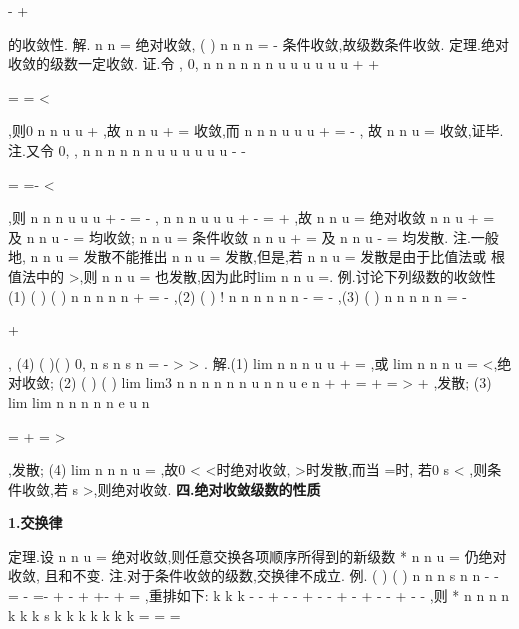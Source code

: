 -
+






\sum 
的收敛性. 
解.
n
n
\infty 
=\sum 
绝对收敛,
(
)
n
n
n
\infty 
=
-
\sum 
条件收敛,故级数条件收敛. 
\textcolor{lyred}{定理}.绝对收敛的级数一定收敛. 
\textcolor{lyred}{证}.令
,
0,
n
n
n
n
n
n
u
u
u
u
u
u
+
\ge 
+

=
=
<

,则0
n
n
u
u
+
\le 
\le 
,故
n
n
u
\infty 
+
=\sum 
收敛,而
n
n
n
u
u
u
+
=
-
, 
故
n
n
u
\infty 
=\sum 
收敛,证毕. 
\textcolor{lyred}{注}.又令
0,
,
n
n
n
n
n
n
u
u
u
u
u
u
-
\ge 
-

=
=-
<

,则
n
n
n
u
u
u
+
-
=
-
,
n
n
n
u
u
u
+
-
=
+
,故 
n
n
u
\infty 
=\sum 
绝对收敛
n
n
u
\infty 
+
=
\Leftrightarrow \sum 
及
n
n
u
\infty 
-
=\sum 
均收敛;
n
n
u
\infty 
=\sum 
条件收敛
n
n
u
\infty 
+
=
\Rightarrow \sum 
及
n
n
u
\infty 
-
=\sum 
均发散. 
\textcolor{lyred}{注}.一般地,
n
n
u
\infty 
=\sum 
发散不能推出
n
n
u
\infty 
=\sum 
发散,但是,若
n
n
u
\infty 
=\sum 
发散是由于比值法或 
根值法中的
\rho >,则
n
n
u
\infty 
=\sum 
也发散,因为此时lim
n
n
u
\to \infty 
=\infty . 
\textcolor{lyred}{例}.讨论下列级数的收敛性 
(1)
(
)
(
)
n n
n
n
n
\infty 
+
=
-
\sum 
,(2)
(
)
!
n
n
n
n
n
n
-
\infty 
=
-
\sum 
,(3)
(
)
n
n
n
n
n
\infty 
=
-


+




\sum 
, 
(4)
(
)(
)
0,
n
s
n
s
n
\alpha 
\alpha 
\infty 
=
-
>
>
\sum 
. 
解.(1)
lim
n
n
n
u
u
+
\to \infty 
=
,或
lim
n
n
n
u
\to \infty 
=
<,绝对收敛; 
(2)
(
)
(
)
lim
lim3
n
n
n
n
n
n
u
n
n
u
e
n
+
+
\to \infty 
\to \infty 
=
+
=
>
+
,发散; 
(3)
lim
lim
n
n
n
n
n
e
u
n
\to \infty 
\to \infty 


=
+
=
>




,发散; 
(4) lim n
n
n
u
\alpha 
\to \infty 
=
,故0
\alpha 
<
<时绝对收敛,
\alpha >时发散,而当
\alpha =时, 
若0
s
<
\le ,则条件收敛,若
s >,则绝对收敛. 
\vspace{4pt}
{\bfseries \textcolor{lyred}{四.绝对收敛级数的性质}}

{\bfseries \textcolor{lyred}{1.交换律}}

\textcolor{lyred}{定理}.设
n
n
u
\infty 
=\sum 
绝对收敛,则任意交换各项顺序所得到的新级数
*
n
n
u
\infty 
=\sum 
仍绝对收敛, 
且和不变. 
\textcolor{lyred}{注}.对于条件收敛的级数,交换律不成立. 
\textcolor{lyred}{例}.
(
)
(
)
n
n
n
s
n
n
\infty 
-
-
=
-
=-
+
-
+
+-
+
=
\sum 
\Lambda 
\Lambda 
,重排如下: 
k
k
k
-
-
+
-
-
+
-
-
+
-
+
-
-
+
-
-
\Lambda 
\Lambda ,则 
*
n
n
n
n
k
k
k
s
k
k
k
k
k
k
k
=
=
=






